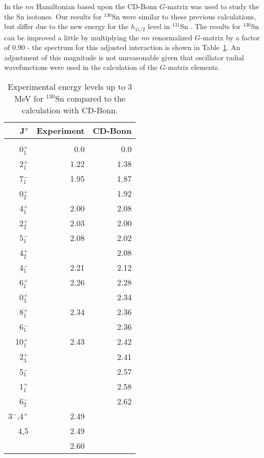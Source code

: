 \documentclass[aps,twocolumn,superscriptaddress,prc,showpacs]{revtex4}
\begin{document}
In \cite{Ho98} the $  nn  $ Hamiltonian
based upon the CD-Bonn $  G  $-matrix was used to study the
the Sn isotones. Our results for $^{130}$Sn were similar
to these previous calculations, but differ due to the
new energy for the $h_{11/2}$ level in $^{131}$Sn \cite{fogel}.
The results for $^{130}$Sn can be improved a little by
multiplying the $nn$ renormalized  $G$-matrix by a factor of
0.90 - the spectrum for this adjusted interaction is shown
in Table~\ref{tab2}. An adjustment of this magnitude is
not unreasonable given that oscillator radial wavefunctions
were used in the calculation of the $G$-matrix elements.
\begingroup
\begin{table}
 \caption{\label{tab2}
Experimental energy levels up to 3 MeV for $^{130}$Sn compared to
the calculation with CD-Bonn.}
\begin{ruledtabular}
\begin{tabular}{rrr}
J$^{ \pi }$ & Experiment & CD-Bonn  \\
\hline \\
  0$^{ + }_{1}$ & 0.0  & 0.0    \\
  2$^{ + }_{1}$ & 1.22 & 1.38   \\
  7$^{-}_{1}$ & 1.95   & 1.87   \\
  0$^{ + }_{2}$ &      & 1.92    \\
 4$^{ + }_{1}$ & 2.00  & 2.08   \\
  2$^{ + }_{2}$ & 2.03 & 2.00   \\
 5$^{-}_{1}$ & 2.08    & 2.02   \\
  4$^{ + }_{2}$ &      & 2.08    \\
 4$^{-}_{1}$ & 2.21    & 2.12   \\
  6$^{ + }_{1}$ & 2.26 & 2.28   \\
  0$^{ + }_{3}$ &      & 2.34    \\
  8$^{ + }_{1}$ & 2.34 & 2.36  \\
  6$^{ - }_{1}$ &      & 2.36   \\
 10$^{ + }_{1}$ & 2.43 & 2.42   \\
  2$^{ + }_{3}$ &      & 2.41   \\
  5$^{ - }_{1}$ &      & 2.57   \\
  1$^{ + }_{1}$ &      & 2.58   \\
  6$^{ - }_{2}$ &      & 2.62   \\
  3$^-$,4$^+$             & 2.49 & \\
    4,5        & 2.49 & \\
               & 2.60 & \\
\end{tabular}
\end{ruledtabular}
\end{table}
\endgroup
\end{document}
